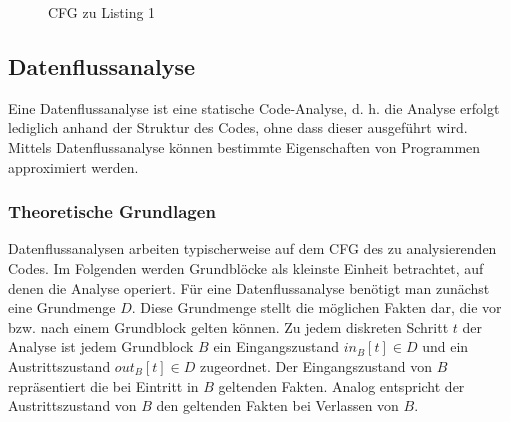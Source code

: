 \begin{figure}[H]
\centering
{}
\caption{CFG zu Listing 1}
\end{figure}

\par

\subsection{Datenflussanalyse}
Eine Datenflussanalyse ist eine statische Code-Analyse, d. h. die Analyse erfolgt lediglich anhand der Struktur des Codes, ohne dass dieser ausgeführt wird. 
Mittels Datenflussanalyse können bestimmte Eigenschaften von Programmen approximiert werden.

\subsubsection{Theoretische Grundlagen}

Datenflussanalysen arbeiten typischerweise auf dem CFG des zu analysierenden Codes.
Im Folgenden werden Grundblöcke als kleinste Einheit betrachtet, auf denen die Analyse operiert.
Für eine Datenflussanalyse benötigt man zunächst eine Grundmenge $D$.
Diese Grundmenge stellt die möglichen Fakten dar, die vor bzw. nach einem Grundblock gelten können.
Zu jedem diskreten Schritt $t$ der Analyse ist jedem Grundblock $B$ ein Eingangszustand $in_B[t] \in D$ und ein Austrittszustand $out_B[t] \in D$ zugeordnet.
Der Eingangszustand von $B$ repräsentiert die bei Eintritt in $B$ geltenden Fakten.
Analog entspricht der Austrittszustand von $B$ den geltenden Fakten bei Verlassen von $B$.

